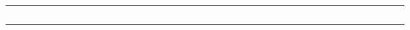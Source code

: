 \documentclass{article}
\begin{document}
\begin{minipage}{\linewidth}
\begin{tabular}{|*{10}{c}*{31}{||c}|}
          & & & & & & & & & & & & & & & & & & & & & & & & & & & & & & & \\  
          & & & & & & & & & & & & & & & & & & & & & & & & & & & & & & & \\  
          & & & & & & & & & & & & & & & & & & & & & & & & & & & & & & & \\  
          & & & & & & & & & & & & & & & & & & & & & & & & & & & & & & & \\  
       & & & & & & & & & & & & & & & & & & & & & & & & & & & & & & & \\ \hline 
\end{tabular} 
\end{minipage} 
~\\ 
\end{document}
